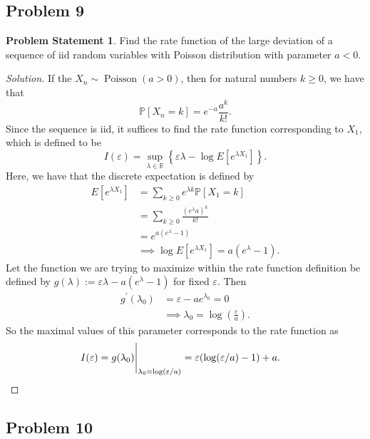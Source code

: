 \documentclass[12pt,reqno]{article}
\theoremstyle{plain}
\theoremstyle{definition}
\newtheorem{problem}[theorem]{Problem Statement}
\begin{document}
\subsection{Problem 9}

\begin{problem}
Find the rate function of the large deviation of a sequence of iid 
random variables with Poisson distribution with parameter $a < 0$. 
\end{problem} 
\begin{proof}[Solution]
If the $X_n \sim \operatorname{Poisson}(a > 0)$, then for natural numbers $k \geq 0$, we have that 
\[
\mathbb{P}[X_n = k] = e^{-a} \frac{a^k}{k!}. 
\]
Since the sequence is iid, it suffices to find the rate function corresponding to $X_1$, 
which is defined to be 
\[
I(\varepsilon) = \sup_{\lambda \in \mathbb{R}} \left\{\varepsilon\lambda - 
     \log E[e^{\lambda X_1}] \right\}. 
\]
Here, we have that the discrete expectation is defined by 
\begin{align*} 
E[e^{\lambda X_1}] & = \sum_{k \geq 0} e^{\lambda k} \mathbb{P}[X_1 = k] \\ 
     & = \sum_{k \geq 0} \frac{(e^{\lambda} a)^k}{k!} \\ 
     & = e^{a(e^{\lambda}-1)} \\ 
     & \implies \log E[e^{\lambda X_1}] = a(e^{\lambda}-1). 
\end{align*} 
Let the function we are trying to maximize within the rate function definition be 
defined by $g(\lambda) := \varepsilon \lambda - a(e^{\lambda}-1)$ for fixed $\varepsilon$. 
Then 
\begin{align*} 
g^{\prime}(\lambda_0) & = \varepsilon - ae^{\lambda_0} = 0 \\ 
     & \implies \lambda_0 = \log\left(\frac{\varepsilon}{a}\right). 
\end{align*} 
So the maximal values of this parameter corresponds to the rate function as 
\begin{align*} 
I(\varepsilon) & = g(\lambda_0) \Biggr\rvert_{\lambda_0 = \log(\varepsilon/a)} 
     = \varepsilon(\log(\varepsilon/a) - 1) + a. 
     \qedhere
\end{align*} 
\end{proof} 

\subsection{Problem 10}
\end{document}
